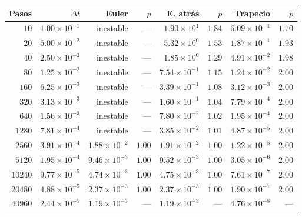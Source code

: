 \begin{tabular}{r r r r r r r r}
\toprule
\rowcolor{Azul1!50}
Pasos & $\Delta t$ & Euler & $p$ & E. atrás & $p$ & Trapecio & $p$ \\
\midrule
$10$ & $1.00\times10^{-1}$ & inestable & --- & $1.90\times10^{1}$ & $1.84$ & $6.09\times10^{-1}$ & $1.70$ \\
$20$ & $5.00\times10^{-2}$ & inestable & --- & $5.32\times10^{0}$ & $1.53$ & $1.87\times10^{-1}$ & $1.93$ \\
$40$ & $2.50\times10^{-2}$ & inestable & --- & $1.85\times10^{0}$ & $1.29$ & $4.91\times10^{-2}$ & $1.98$ \\
$80$ & $1.25\times10^{-2}$ & inestable & --- & $7.54\times10^{-1}$ & $1.15$ & $1.24\times10^{-2}$ & $2.00$ \\
$160$ & $6.25\times10^{-3}$ & inestable & --- & $3.39\times10^{-1}$ & $1.08$ & $3.12\times10^{-3}$ & $2.00$ \\
$320$ & $3.13\times10^{-3}$ & inestable & --- & $1.60\times10^{-1}$ & $1.04$ & $7.79\times10^{-4}$ & $2.00$ \\
$640$ & $1.56\times10^{-3}$ & inestable & --- & $7.80\times10^{-2}$ & $1.02$ & $1.95\times10^{-4}$ & $2.00$ \\
$1280$ & $7.81\times10^{-4}$ & inestable & --- & $3.85\times10^{-2}$ & $1.01$ & $4.87\times10^{-5}$ & $2.00$ \\
$2560$ & $3.91\times10^{-4}$ & $1.88\times10^{-2}$ & $1.00$ & $1.91\times10^{-2}$ & $1.00$ & $1.22\times10^{-5}$ & $2.00$ \\
$5120$ & $1.95\times10^{-4}$ & $9.46\times10^{-3}$ & $1.00$ & $9.52\times10^{-3}$ & $1.00$ & $3.05\times10^{-6}$ & $2.00$ \\
$10240$ & $9.77\times10^{-5}$ & $4.74\times10^{-3}$ & $1.00$ & $4.75\times10^{-3}$ & $1.00$ & $7.61\times10^{-7}$ & $2.00$ \\
$20480$ & $4.88\times10^{-5}$ & $2.37\times10^{-3}$ & $1.00$ & $2.37\times10^{-3}$ & $1.00$ & $1.90\times10^{-7}$ & $2.00$ \\
$40960$ & $2.44\times10^{-5}$ & $1.19\times10^{-3}$ & --- & $1.19\times10^{-3}$ & --- & $4.76\times10^{-8}$ & --- \\
\bottomrule
\end{tabular}
